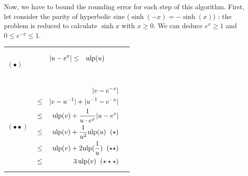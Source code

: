 \documentclass[12pt]{amsart}
\def\pinf{\bigtriangleup}
\def\minf{\bigtriangledown}
\def\ulp{{\rm ulp}}
\begin{document}
Now, we have to bound the rounding error for each step of this
algorithm.  First, let consider the parity of hyperbolic sine
($\sinh(-x)=-\sinh(x)$) : the problem is reduced to calculate $\sinh x$
with $x \geq 0$. We can deduce $e^x \geq 1$ and $0 \leq e^{-x} \leq
1$.



\begin{center}
\begin{tabular}{l l l}

\begin{minipage}{2.5cm}


${\textnormal{error}}(u)$


$u \leftarrow \minf(e^x)$\\
$(\bullet)$

\end{minipage} &
\begin{minipage}{7.5cm}

\begin{eqnarray}\nonumber
  |u-e^x| &\leq& \ulp(u)\\\nonumber
\end{eqnarray}

\end{minipage} &
\begin{minipage}{6cm}
{\hspace{7cm}}
\end{minipage}\\%
\begin{minipage}{2.5cm}
${\textnormal{error}}(v)$


$v \leftarrow \pinf({u}^{-1}) $\\
$(\bullet\bullet)$
\end{minipage} &
\begin{minipage}{7.5cm}



\begin{eqnarray}\nonumber
  &&|v-e^{-x}| \\\nonumber
  &       \leq&  |v - u^{-1}| +  |u^{-1}  - e^{-x}|\\\nonumber
  &       \leq& \ulp(v) + \frac{1}{u \cdot e^x} |u-e^{x}|\\\nonumber
  &       \leq& \ulp(v) + \frac{1}{u^2} \ulp(u)\;\;(\star)\\\nonumber
  &       \leq& \ulp(v) + 2 \ulp(\frac{1}{u})\;\;(\star\star)\\\nonumber
  &       \leq& 3 \, \ulp(v)\;\;(\star\star\star)
\end{eqnarray}



\end{minipage}
\end{tabular}
\end{center}
\end{document}
